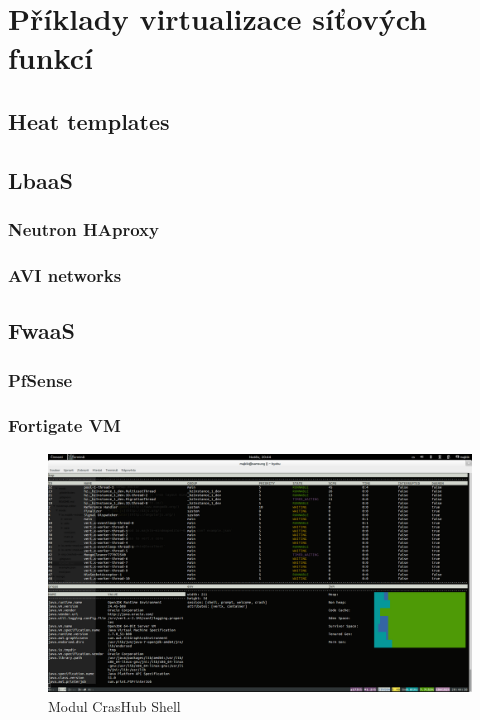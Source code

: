 \chapter{Příklady virtualizace síťových funkcí}

\section{Heat templates}\label{sub:interaction}

\section{LbaaS}\label{sub:interaction}

\subsection{Neutron HAproxy}\label{sub:interaction}

\subsection{AVI networks}\label{sub:interaction}

\section{FwaaS}\label{sub:interaction}

\subsection{PfSense}\label{sub:interaction}

\subsection{Fortigate VM}\label{sub:interaction}


\begin{figure}[h]
\begin{centering}
\includegraphics[scale=0.21]{images/real_interaction}
\par\end{centering}
\caption{Modul CrasHub Shell\label{fig:real_interaction}}
\end{figure}
